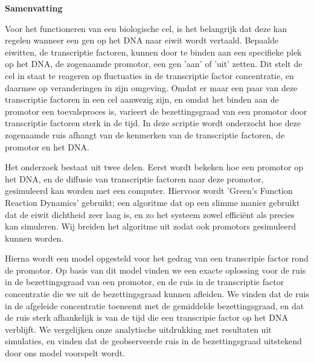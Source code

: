 \begin{center}
{\center \bf Samenvatting}
\end{center}

Voor het functioneren van een biologische cel, is het belangrijk dat deze kan regelen wanneer een gen op het DNA naar eiwit wordt vertaald. Bepaalde eiwitten, de transcriptie factoren, kunnen door te binden aan een specifieke plek op het DNA, de zogenaamde promotor, een gen 'aan' of 'uit' zetten. Dit stelt de cel in staat te reageren op fluctuaties in de transcriptie factor concentratie, en daarmee op veranderingen in zijn omgeving. Omdat er maar een paar van deze transcriptie factoren in een cel aanwezig zijn, en omdat het binden aan de promotor een toevalsproces is, varieert de bezettingsgraad van een promotor door transcriptie factoren sterk in de tijd. In deze scriptie wordt onderzocht hoe deze zogenaamde ruis afhangt van de kenmerken van de transcriptie factoren, de promotor en het DNA. 

Het onderzoek bestaat uit twee delen. Eerst wordt bekeken hoe een promotor op het DNA, en de diffusie van transcriptie factoren naar deze promotor, gesimuleerd kan worden met een computer. Hiervoor wordt 'Green's Function Reaction Dynamics' gebruikt; een algoritme dat op een slimme manier gebruikt dat de eiwit dichtheid zeer laag is, en zo het systeem zowel effici\"ent als precies kan simuleren. Wij breiden het algoritme uit zodat ook promotors gesimuleerd kunnen worden.

Hierna wordt een model opgesteld voor het gedrag van een transcripie factor rond de promotor. Op basis van dit model vinden we een exacte oplossing voor de ruis in de bezettingsgraad van een promotor, en de ruis in de transcriptie factor concentratie die we uit de bezettingsgraad kunnen afleiden. We vinden dat de ruis in de afgeleide concentratie toeneemt met de gemiddelde bezettingsgraad, en dat de ruis sterk afhankelijk is van de tijd die een transcripie factor op het DNA verblijft. We vergelijken onze analytische uitdrukking met resultaten uit simulaties, en vinden dat de geobserveerde ruis in de bezettingsgraad uitstekend door ons model voorspelt wordt.